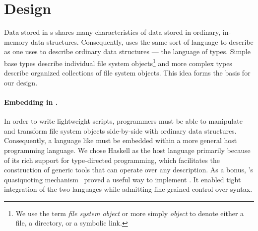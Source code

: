 \section{\forest{} Design}
\label{sec:language}

Data stored in \filestore{}s shares many characteristics of
data stored in ordinary, in-memory data structures.
Consequently, \forest{}
uses the same sort of language to describe \filestores{} as one uses to describe
ordinary data structures --- the language of types. 
Simple base
types describe individual file system objects\footnote{We use the term
\emph{file system object} or more simply \emph{object} to denote either a
file, a directory, or a symbolic link.} and more complex types 
describe organized collections of file system 
objects. 
This idea forms the basis for our design.

\paragraph*{Embedding \forest{} in \haskell{}.}
In order to write lightweight scripts, 
programmers must be able to manipulate and transform file system 
objects side-by-side with ordinary data structures.  Consequently,
a language like \forest{} must be embedded within a more general
host programming language.
We chose
Haskell as the host language primarily because of its rich support for 
type-directed programming, which facilitates the construction of generic 
tools that can operate over any \forest{}
description.  As a bonus, \haskell{}'s quasiquoting 
mechanism~\cite{Mainland:quasi} proved a
useful way to implement \forest{}.  It enabled tight integration of
the two languages while admitting fine-grained control 
over \forest{} syntax.
  

